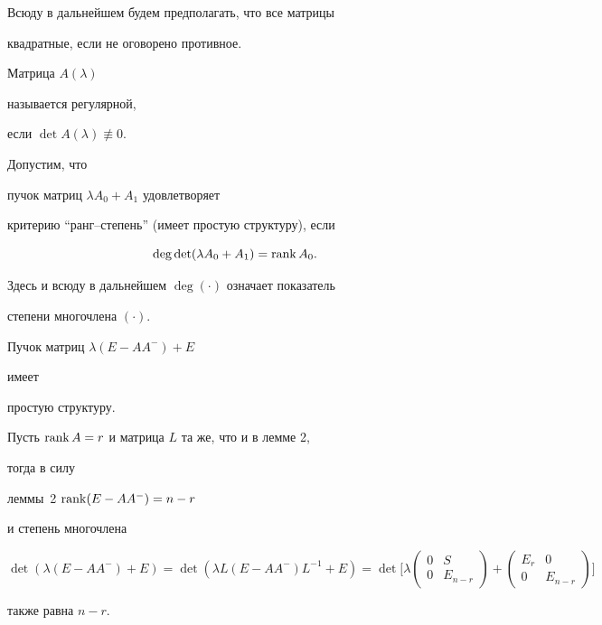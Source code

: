  


Всюду в дальнейшем будем предполагать, что все матрицы 


квадратные, если не оговорено противное. 


 


\begin{defn} Матрица $A(\lambda)$ 


называется регулярной, 


если $\det A(\lambda)\not\equiv 0$. 


\end{defn} 


 


\begin{defn} Допустим, что 


пучок матриц $\lambda A_0+A_1$ удовлетворяет 


критерию ``ранг--степень'' (имеет простую структуру), если 


$$ 


\deg\det(\lambda A_0+A_1)=\rank A_0. 


$$ 


Здесь и всюду в дальнейшем $\deg(\cdot)$ означает показатель 


степени многочлена $(\cdot)$. 


\end{defn} 


 


\begin{lem} Пучок матриц $\lambda(E-AA^-)+E$ 


имеет 


простую структуру. 


\end{lem} 


 


\begin{pf} Пусть $\operatorname{rank} A=r$ и матрица $L$ та же, что и в лемме 2,


тогда в силу 


леммы~2\; $\operatorname{rank}(E-AA^-)=n-r$ 


и степень многочлена 


$$ 


\det(\lambda(E-AA^-)+E)=\det(\lambda L(E-AA^-)L^{-1}+E)= 


\det\bigg[\lambda 


\begin{pmatrix} 0 & S \\ 0 & E_{n-r} \end{pmatrix} + 


\begin{pmatrix} E_r & 0 \\ 0 & E_{n-r}\end{pmatrix} 


\bigg] 


$$ 


также равна $n-r$. 


\end{pf} 


